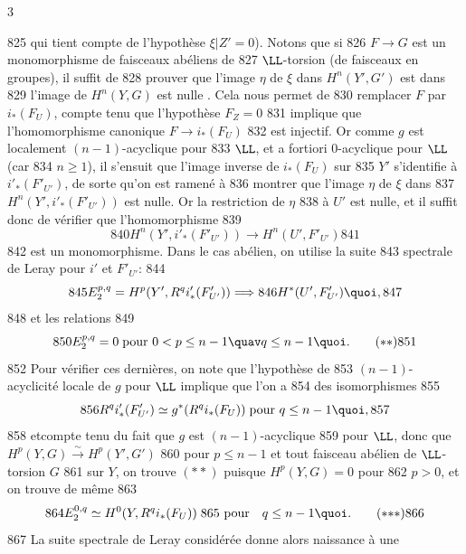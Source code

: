 3	\documentclass[10pt]{../fichiers-configuration-latex/smfart}
\begin{document}
   825	qui tient compte de l'hypothèse $\xi|Z'=0$). Notons que si
   826	$F\rightarrow G$ est un monomorphisme de faisceaux abéliens de
   827	$\LL$-torsion (\resp de faisceaux en groupes), il suffit de
   828	prouver que l'image $\eta$ de $\xi$ dans $H^{n}(Y', G')$ est dans
   829	l'image de $H^{n}(Y,G)$ \ie est nulle . Cela nous permet de
   830	remplacer $F$ par $i_{\ast}(F_U)$, compte tenu que l'hypothèse $F_Z=0$
   831	implique que l'homomorphisme canonique $F\rightarrow i_{\ast}(F_U)$
   832	est injectif. Or comme $g$ est localement $(n-1)$-acyclique pour
   833	$\LL$, et a fortiori $0$-acyclique pour $\LL$ (car
   834	$n\geq 1$), il s'ensuit que l'image inverse de $i_{\ast}(F_U)$ sur
   835	$Y'$ s'identifie à $i'_{\ast}(F'_{U'})$, de sorte qu'on est ramené à
   836	montrer que l'image $\eta$ de $\xi$ dans
   837	$H^{n}(Y',i'_{\ast}(F'_{U'}))$ est nulle. Or la restriction de $\eta$
   838	à $U'$ est nulle, et il suffit donc de vérifier que l'homomorphisme
   839	\begin{equation*}
   840	H^{n}(Y',i'_{\ast}(F'_{U'}))\longrightarrow H^{n}(U',F'_{U'})\tag{$\ast$}
   841	\end{equation*}
   842	est un monomorphisme. Dans le cas abélien, on utilise la suite
   843	spectrale de Leray pour $i'$ et $F'_{U'}$:
   844	$$
   845	E^{p,q}_2=H^p(Y',R^qi'_{\ast}(F'_{U'}))\Longrightarrow
   846	H^{\ast}(U',F'_{U'}){\quoi},
   847	$$
   848	et les relations
   849	\begin{equation*}
   850	E^{p,q}_2=0\; \mbox{\rm pour } 0<p\leq n-1\quav q\leq n-1{\quoi}.\tag{${\ast}{\ast}$}
   851	\end{equation*}
   852	Pour vérifier ces dernières, on note que l'hypothèse de
   853	$(n-1)$-acyclicité locale de $g$ pour $\LL$ implique que l'on a
   854	des isomorphismes
   855	$$
   856	R^{q}i'_{\ast}(F'_{U'})\simeq g^{\ast}(R^{q}i_{\ast}(F_U))\;\mbox{\rm pour } q\leq n-1{\quoi},
   857	$$
   858	et\pageoriginale compte tenu du fait que $g$ est $(n-1)$-acyclique
   859	pour $\LL$, donc que $H^{p}(Y,G)\xrightarrow{\sim}H^{p}(Y',G')$
   860	pour $p\leq n-1$ et tout faisceau abélien de $\LL$-torsion $G$
   861	sur $Y$, on trouve $({\ast}{\ast})$ puisque $H^{p}(Y,G)=0$ pour
   862	$p>0$, et on trouve de même
   863	\begin{equation*}
   864	E^{0,q}_2\simeq H^{0}(Y,R{}^qi_{\ast}(F_U))\;\mbox{\rm
   865	pour}\quad q\leq n-1{\quoi}.\tag{${\ast}{\ast}{\ast}$}
   866	\end{equation*}
   867	La suite spectrale de Leray considérée donne alors naissance à une
\end{document}
